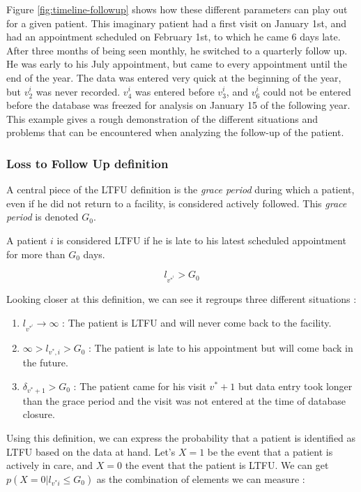 Figure \ref{fig:timeline-followup} shows how these different parameters can play out for a given patient. This imaginary patient had a first visit on January 1st, and had an appointment scheduled on February 1st, to which he came 6 days late. After three months of being seen monthly, he switched to a quarterly follow up. He was early to his July appointment, but came to every appointment until the end of the year. The data was entered very quick at the beginning of the year, but $v_2^i$ was never recorded. $v_4^i$ was entered before $v_3^i$, and $v_6^i$ could not be entered before the database was freezed for analysis on January 15 of the following year. This example gives a rough demonstration of the different situations and problems that can be encountered when analyzing the follow-up of the patient.

\subsubsection{Loss to Follow Up definition}

A central piece of the LTFU definition is the  \textit{grace period} during which a patient, even if he did not return to a facility, is considered actively followed. This \textit{grace period} is denoted $G_0$.

A patient $i$ is considered LTFU if he is late to his latest scheduled appointment for more than $G_0$ days.

$$l_{v^{*}^i} >  G_0$$

Looking closer at this definition, we can see it regroups three different situations :
\begin{enumerate}
\item $l_{v^{*}^i} \rightarrow \infty$ : The patient is LTFU and will never come back to the facility.
\item $\infty > l_{v^{*},i} > G_0$ : The patient is late to his appointment but will come back in the future.
\item  $\delta_{v^*+1} > G_0$ : The patient came for his visit $v^{*} + 1$ but data entry took longer than the grace period and the visit was not entered at the time of database closure.
\end{enumerate}

Using this definition, we can express the probability that a patient is identified as LTFU based on the data at hand. Let's $X = 1$ be the event that a patient is actively in care, and $X = 0$  the event that the patient is LTFU. We can get $p(X = 0 | l_{v^{*}i} \leq  G_0)$ as the combination of elements we can measure :


